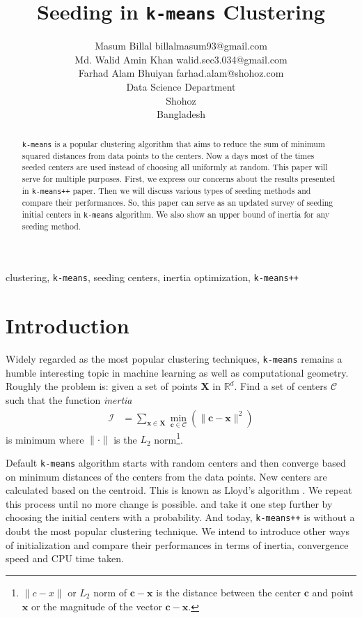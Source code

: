 \documentclass[twoside, 11pt]{article}
\title{Seeding in \texttt{k-means} Clustering}
\author{\name Masum Billal 
	\email billalmasum93@gmail.com\\
	\name Md. Walid Amin Khan
	\email walid.sec3.034@gmail.com\\
	\name Farhad Alam Bhuiyan
	\email farhad.alam@shohoz.com\\
	\addr Data Science Department\\
	Shohoz\\
	Bangladesh
}
\newcommand{\x}{\mathbf{x}}
\newcommand{\X}{\mathbf{X}}
\renewcommand{\c}{\mathbf{c}}
\newcommand{\C}{\mathcal{C}}
\begin{document}
	
	\maketitle
		\begin{abstract}%
			\texttt{k-means} is a popular clustering algorithm that aims to reduce the sum of minimum squared distances from data points to the centers. Now a days most of the times seeded centers are used instead of choosing all uniformly at random. This paper will serve for multiple purposes. First, we express our concerns about the results presented in \texttt{k-means++} paper. Then we will discuss various types of seeding methods and compare their performances. So, this paper can serve as an updated survey of seeding initial centers in \texttt{k-means} algorithm. We also show an upper bound of inertia for any seeding method.
		\end{abstract}
	
		\begin{keywords}
			clustering, \texttt{k-means}, seeding centers, inertia optimization, \texttt{k-means++}
		\end{keywords}
	\section{Introduction}
	Widely regarded as the most popular clustering techniques, \texttt{k-means} remains a humble interesting topic in machine learning as well as computational geometry. Roughly the problem is: given a set of points $\X$ in $\mathbb{R}^d$. Find a set of centers $\mathcal{C}$ such that the function \textit{inertia}
		\begin{align*}
			\mathcal{I} & = \sum_{\x\in\X}\min_{\c\in\C}(\|\c-\x\|^2)
		\end{align*}
	is minimum where $\|\cdot\|$ is the $L_2$ norm\footnote{$\|c-x\|$ or $L_2$ norm of $\c-\x$ is the distance between the center $\c$ and point $\x$ or the magnitude of the vector $\c-\x$.}.
	
	Default \texttt{k-means} algorithm starts with random centers and then converge based on minimum distances of the centers from the data points. New centers are calculated based on the centroid. This is known as Lloyd's algorithm \citep{lloyd}. We repeat this process until no more change is possible. \cite{ostrovsky} and \cite{kmeans++} take it one step further by choosing the initial centers with a probability. And today, \texttt{k-means++} is without a doubt the most popular clustering technique. We intend to introduce other ways of initialization and compare their performances in terms of inertia, convergence speed and CPU time taken.
	
\end{document}
